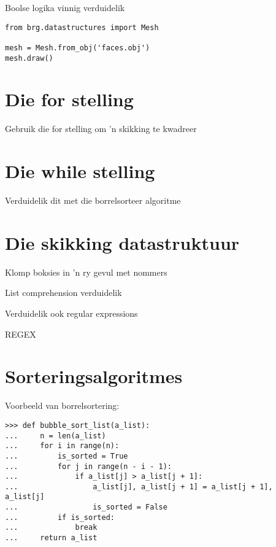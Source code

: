 Boolse logika vinnig verduidelik



\lstset{language=Python}
\lstset{frame=lines}
\lstset{basicstyle=\footnotesize}
\begin{lstlisting}
from brg.datastructures import Mesh
 
mesh = Mesh.from_obj('faces.obj')
mesh.draw()
\end{lstlisting}




\chapter[Die for stelling]
{Die for stelling}

Gebruik die for stelling om 'n skikking te kwadreer


\chapter[Die while stelling]
{Die while stelling}

Verduidelik dit met die borrelsorteer algoritme


\chapter[Skikkings en lyste]
{Die skikking datastruktuur}

Klomp boksies in 'n ry gevul met nommers


List comprehension verduidelik

Verduidelik ook regular expressions

REGEX

\chapter[Sortering]
{Sorteringsalgoritmes}

Voorbeeld van borrelsortering:

\lstset{language=Python}
\lstset{frame=lines}
\lstset{basicstyle=\footnotesize}
\begin{lstlisting}
>>> def bubble_sort_list(a_list):
...     n = len(a_list)
...     for i in range(n):
...         is_sorted = True
...         for j in range(n - i - 1):
...             if a_list[j] > a_list[j + 1]:
...                 a_list[j], a_list[j + 1] = a_list[j + 1], a_list[j]
...                 is_sorted = False
...         if is_sorted:
...             break
...     return a_list
\end{lstlisting}


